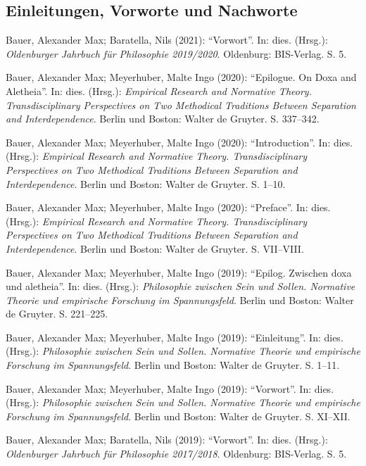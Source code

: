 \documentclass[a4paper,10pt]{article}
\newenvironment{literature}{%
   \parskip6pt\parindent0pt\raggedright
   \def\lititem{\hangindent=1cm\hangafter1}}{%
   \par\ignorespaces}
\begin{document}
\subsection*{Einleitungen, Vorworte und Nachworte}
\begin{literature}
\lititem Bauer, Alexander Max; Baratella, Nils (2021): \enquote{Vorwort}. In: dies. (Hrsg.): \textit{Oldenburger Jahrbuch für Philosophie 2019/2020}. Oldenburg: BIS-Verlag. S. 5.

\lititem Bauer, Alexander Max; Meyerhuber, Malte Ingo (2020): \enquote{Epilogue. On Doxa and Aletheia}. In: dies. (Hrsg.): \textit{Empirical Research and Normative Theory. Transdisciplinary Perspectives on Two Methodical Traditions Between Separation and Interdependence}. Berlin und Boston: Walter de Gruyter. S. 337--342.

\lititem Bauer, Alexander Max; Meyerhuber, Malte Ingo (2020): \enquote{Introduction}. In: dies. (Hrsg.): \textit{Empirical Research and Normative Theory. Transdisciplinary Perspectives on Two Methodical Traditions Between Separation and Interdependence}. Berlin und Boston: Walter de Gruyter. S. 1--10.

\lititem Bauer, Alexander Max; Meyerhuber, Malte Ingo (2020): \enquote{Preface}. In: dies. (Hrsg.): \textit{Empirical Research and Normative Theory. Transdisciplinary Perspectives on Two Methodical Traditions Between Separation and Interdependence}. Berlin und Boston: Walter de Gruyter. S. VII--VIII.

\lititem Bauer, Alexander Max; Meyerhuber, Malte Ingo (2019): \enquote{Epilog. Zwischen doxa und aletheia}. In: dies. (Hrsg.): \textit{Philosophie zwischen Sein und Sollen. Normative Theorie und empirische Forschung im Spannungsfeld}. Berlin und Boston: Walter de Gruyter. S. 221--225.

\lititem Bauer, Alexander Max; Meyerhuber, Malte Ingo (2019): \enquote{Einleitung}. In: dies. (Hrsg.): \textit{Philosophie zwischen Sein und Sollen. Normative Theorie und empirische Forschung im Spannungsfeld}. Berlin und Boston: Walter de Gruyter. S. 1--11.

\lititem Bauer, Alexander Max; Meyerhuber, Malte Ingo (2019): \enquote{Vorwort}. In: dies. (Hrsg.): \textit{Philosophie zwischen Sein und Sollen. Normative Theorie und empirische Forschung im Spannungsfeld}. Berlin und Boston: Walter de Gruyter. S. XI--XII.

\lititem Bauer, Alexander Max; Baratella, Nils (2019): \enquote{Vorwort}. In: dies. (Hrsg.): \textit{Oldenburger Jahrbuch für Philosophie 2017/2018}. Oldenburg: BIS-Verlag. S. 5.
\end{literature}
\end{document}
